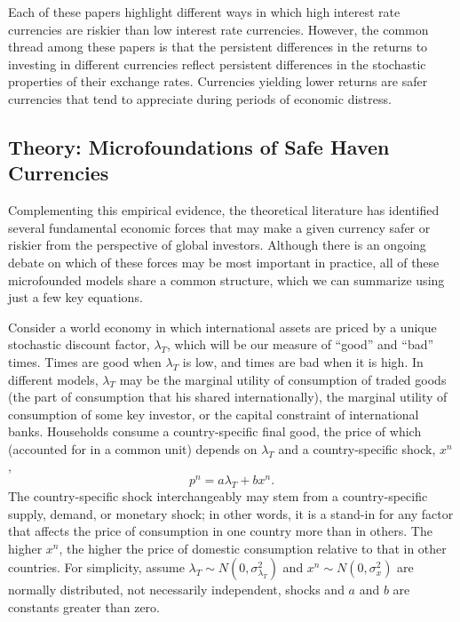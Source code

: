 \documentclass[12pt,letter]{article}
\theoremstyle{break} \theorembodyfont{\normalfont\itshape}
\theoremstyle{break}
\theoremstyle{break} \theorembodyfont{\normalfont\itshape}
\theoremstyle{break} \theorembodyfont{\normalfont\itshape}
\begin{document}
Each of these papers highlight different ways in which high interest
rate currencies are riskier than low interest rate currencies.
However, the common thread among these papers is that the persistent
differences in the returns to investing in different currencies
reflect persistent differences in the stochastic properties of their
exchange rates. Currencies yielding lower returns are safer currencies
that tend to appreciate during periods of economic distress.

\subsection{Theory: Microfoundations of Safe Haven Currencies}

Complementing this empirical evidence, the theoretical literature has
identified several fundamental economic forces that may make a given
currency safer or riskier from the perspective of global investors.
Although there is an ongoing debate on which of these forces may be
most important in practice, all of these microfounded models share a
common structure, which we can summarize using just a few key
equations.

Consider a world economy in which international assets are priced by a
unique stochastic discount factor, $\lambda_T$, which will be our
measure of ``good'' and ``bad'' times. Times are good when $\lambda_T$
is low, and times are bad when it is high. In different models,
$\lambda_T$ may be the marginal utility of consumption of traded goods
(the part of consumption that his shared internationally), the
marginal utility of consumption of some key investor, or the capital
constraint of international banks. Households consume a
country-specific final good, the price of which (accounted for in a
common unit) depends on $\lambda_T$ and a country-specific shock,
$x^n$,
\begin{equation}
  p^{n}=a\lambda _{T}+b x^{n}.  \label{eq_RF}
\end{equation}%
The country-specific shock interchangeably may stem from a
country-specific supply, demand, or monetary shock; in other words, it
is a stand-in for any factor that affects the price of consumption in
one country more than in others. The higher $x^{n}$, the higher the
price of domestic consumption relative to that in other countries. For
simplicity, assume $\lambda _{T}\sim N(0,\sigma^2_{\lambda_{T}})$ and
$x^{n} \sim N(0,\sigma^2_x) $ are normally distributed, not
necessarily independent, shocks and $a$ and $b$ are constants greater
than zero.
\end{document}
